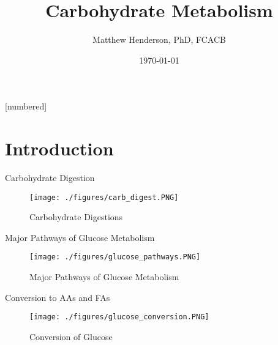 \documentclass[presentation, smaller]{beamer}
\author{Matthew Henderson, PhD, FCACB}
\date{\today}
\title{Carbohydrate Metabolism}
\institute[NSO]{Newborn Screening Ontario | The University of Ottawa}
\begin{document}
\maketitle


\vspace{220pt}
\beamertemplatenavigationsymbolsempty
{}[numbered]

\section{Introduction}
\label{sec:orgdfe585e}
\begin{frame}[label={sec:org030bfd9}]{Carbohydrate Digestion}
\begin{figure}[htbp]
\centering
\texttt{[image: ./figures/carb\_digest.PNG]}
\caption{\label{fig:org8eab136}
Carbohydrate Digestions}
\end{figure}
\end{frame}

\begin{frame}[label={sec:orgc257b4a}]{Major Pathways of Glucose Metabolism}
\begin{figure}[htbp]
\centering
\texttt{[image: ./figures/glucose\_pathways.PNG]}
\caption{\label{fig:orgc60db26}
Major Pathways of Glucose Metabolism}
\end{figure}
\end{frame}

\begin{frame}[label={sec:org644f287}]{Conversion to AAs and FAs}
\begin{figure}[htbp]
\centering
\texttt{[image: ./figures/glucose\_conversion.PNG]}
\caption{\label{fig:org53da104}
Conversion of Glucose}
\end{figure}
\end{frame}
\end{document}
